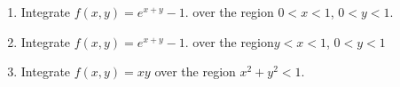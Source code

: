 \begin{frame}

\begin{block}{\exercise}

\begin{enumerate}
\item Integrate $f(x,y)=e^{x+y}-1.
$ over the region $0 < x < 1$, $0<y<1$.
\item Integrate $f(x,y)=e^{x+y}-1.
$ over the region$y < x < 1$, $0 < y < 1$
\item Integrate $f(x,y)=xy$ over the region $x^2 + y^2 < 1$.
\end{enumerate}

\end{block}
\end{frame}


